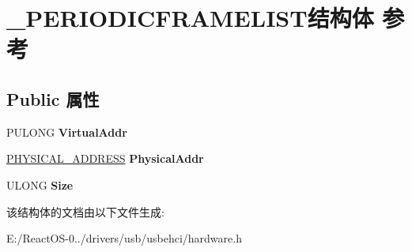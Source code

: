 \hypertarget{struct___p_e_r_i_o_d_i_c_f_r_a_m_e_l_i_s_t}{}\section{\+\_\+\+P\+E\+R\+I\+O\+D\+I\+C\+F\+R\+A\+M\+E\+L\+I\+S\+T结构体 参考}
\label{struct___p_e_r_i_o_d_i_c_f_r_a_m_e_l_i_s_t}
\subsection*{Public 属性}
\begin{DoxyCompactItemize}
\item 
\mbox{\label{struct___p_e_r_i_o_d_i_c_f_r_a_m_e_l_i_s_t_a3521efece19cacebdb914e520c7a388a}} 
P\+U\+L\+O\+NG {\bfseries Virtual\+Addr}
\item 
\mbox{\label{struct___p_e_r_i_o_d_i_c_f_r_a_m_e_l_i_s_t_aad5a3ad1d40c29f94c85292449628bcb}} 
\hyperlink{union___l_a_r_g_e___i_n_t_e_g_e_r}{P\+H\+Y\+S\+I\+C\+A\+L\+\_\+\+A\+D\+D\+R\+E\+SS} {\bfseries Physical\+Addr}
\item 
\mbox{\label{struct___p_e_r_i_o_d_i_c_f_r_a_m_e_l_i_s_t_a204c6dceb52926e64b573294e2b22038}} 
U\+L\+O\+NG {\bfseries Size}
\end{DoxyCompactItemize}


该结构体的文档由以下文件生成\+:\begin{DoxyCompactItemize}
\item 
E\+:/\+React\+O\+S-\/0../drivers/usb/usbehci/hardware.\+h\end{DoxyCompactItemize}
